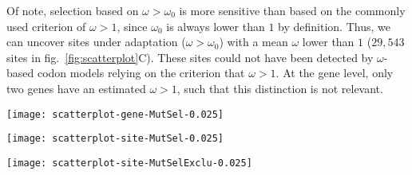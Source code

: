 \documentclass{article}
\begin{document}
    Of note, selection based on $\omega>\omega_{0}$ is more sensitive than based on the commonly used criterion of $\omega>1$, since $\omega_{0}$ is always lower than $1$ by definition\cite{spielman_relationship_2015}.
    Thus, we can uncover sites under adaptation ($\omega>\omega_{0}$) with a mean $\omega$ lower than $1$ ($29,543$ sites in fig.~\ref{fig:scatterplot}C).
    These sites could not have been detected by $\omega$-based codon models relying on the criterion that $\omega>1$.
    At the gene level, only two genes have an estimated $\omega > 1$, such that this distinction is not relevant.
    \begin{figure*}[htb]
        \centering
        \begin{minipage}{0.32\linewidth}
            \texttt{[image: scatterplot-gene-MutSel-0.025]}
        \end{minipage}
        \hfill
        \begin{minipage}{0.32\linewidth}
            \texttt{[image: scatterplot-site-MutSel-0.025]}
        \end{minipage}
        \hfill
        \begin{minipage}{0.32\linewidth}
            \texttt{[image: scatterplot-site-MutSelExclu-0.025]}
        \end{minipage}
        \hfill
        \caption{
            Detection of protein-coding sequences ongoing adaptation at the phylogenetic scale.
            $\omega$ estimated by the site model against $\omega_{0}$ calculated by the mutation-selection model.
            Scatter plot of $14,509$ genes in panel A, with $95$\% bayesian credible interval ($\alpha=0.05$).
            Density plot of sites in panel B and C.
            Genes or sites are then classified whether they detected as adaptive ($\omega > \omega_{0}$ in red) or nearly-neutral ($\omega \simeq \omega_{0}$ in green).
            In panel C, the set of sites detected exclusively by mutation-selection codon models have a mean $\omega < 1 $.}
        \label{fig:scatterplot}
    \end{figure*}
\end{document}
